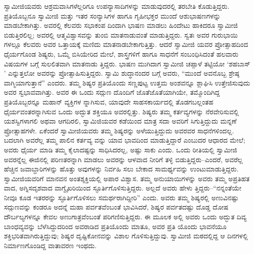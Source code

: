 ಸ್ವಾಮೀಜಿಯವರು ಆಶ್ರಮವಾಸಿಗಳೆಲ್ಲರಿಗೂ ಉಪನ್ಯಾಸಾದಿಗಳನ್ನು ಮಾಡುವುದರಲ್ಲಿ ತರಬೇತಿ ಕೊಡುತ್ತಿದ್ದರು. ಪ್ರತಿಯೊಬ್ಬನೂ ಸ್ವಾಮೀಜಿ ಮತ್ತು ಇತರ ಸಂನ್ಯಾಸಿಗಳ ಹಾಗೂ ಗೃಹೀಭಕ್ತರ ಮುಂದೆ ಆಶುಭಾಷಣಗಳನ್ನು ಮಾಡಬೇಕಾಗಿತ್ತು. ಅವರಲ್ಲಿ ಕೆಲವರು ಸಭಾಕಂಪ ದಿಂದಾಗಿ ಭಾಷಣ ಮಾಡಲು ಹಿಂದೇಟು ಹಾಕಿದರೂ ಸ್ವಾಮೀಜಿ ಬಿಡುತ್ತಿರಲಿಲ್ಲ; ಅವರಲ್ಲಿ ಆತ್ಮವಿಶ್ವಾಸವನ್ನು ತುಂಬಿ ಮಾತನಾಡುವಂತೆ ಮಾಡುತ್ತಿದ್ದರು. ಸ್ವತಃ ಅವರ ಗುರುಭಾಯಿ ಗಳಲ್ಲೂ ಕೆಲವರು ಅವರ ಒತ್ತಾಯಕ್ಕೆ ಮಣಿದು ಮಾತನಾಡಬೇಕಾಗುತ್ತಿತ್ತು. ಆದರೆ ಸ್ವಾಮೀಜಿ ಯವರ ಪ್ರೋತ್ಸಾಹದಿಂದ ಧೈರ್ಯಗೊಂಡ ಶಿಷ್ಯರು, ಒಮ್ಮೆ ಬಿಸಿಯೇರಿದ ಮೇಲೆ, ಶಾಸ್ತ್ರಗಳಿಗೆ ಹಾಗೂ ಸಾಧನೆಗೆ ಸಂಬಂಧಿಸಿದಂತೆ ಹಲವಾರು ವಿಷಯಗಳ ಬಗ್ಗೆ ಸುಲಲಿತವಾಗಿ ಮಾತನಾಡು ತ್ತಿದ್ದರು. ಭಾಷಣ ಮುಗಿದಾಗ ಸ್ವಾಮೀಜಿ ಚಪ್ಪಾಳೆ ತಟ್ಟಿಯೋ ‘ಶಹಬಾಸ್​’ ಎನ್ನುತ್ತಲೋ ಅವರನ್ನು ಪ್ರೋತ್ಸಾಹಿಸುತ್ತಿದ್ದರು. ಸ್ವಾಮಿ ಶುದ್ಧಾನಂದರ ಬಗ್ಗೆ ಅವರು, “ಮುಂದೆ ಅವನೊಬ್ಬ ಶ್ರೇಷ್ಠ ವಾಗ್ಮಿಯಾಗುತ್ತಾನೆ” ಎಂದರು. ತಮ್ಮ ಶಿಷ್ಯರ ಪ್ರತಿಯೊಂದು ಸಣ್ಣಪುಟ್ಟ ಉತ್ತಮ ಅಂಶವನ್ನೂ ಶ್ಲಾಘಿಸಿ ಉತ್ತೇಜಿಸುವುದು ಅವರ ಸ್ವಭಾವವಾಗಿತ್ತು. ಅವರ ಈ ಒಂದು ಸದ್ಗುಣ ದೊಂದಿಗೆ ಜೊತೆಜೊತೆಯಾಗಿಯೇ, ತಮ್ಮೊಂದಿಗಿದ್ದ ಪ್ರತಿಯೊಬ್ಬರನ್ನೂ ಮಹಾನ್ ವ್ಯಕ್ತಿಗಳ ನ್ನಾಗಿಸುವ, ಯಾವುದೇ ಸಾಹಸಕಾರ್ಯದಲ್ಲಿ ತೊಡಗಬಲ್ಲಂತಹ ಧೈರ್ಯವಂತರನ್ನಾಗಿಸುವ ಒಂದು ಅದ್ಭುತ ಶಕ್ತಿಯೂ ಅವರಲ್ಲಿತ್ತು. ಶಿಷ್ಯರು ತಮ್ಮ ಕರ್ತವ್ಯಗಳನ್ನು ನೆರವೇರಿಸುವಲ್ಲಿ ಯಶಸ್ವಿಗಳಾಗಲಿ ಅಥವಾ ಆಗದಿರಲಿ, ಸ್ವಾಮಿಜಿಯವರ ಕಡೆಯಿಂದ ಮಾತ್ರ ಸದಾ ಅವರಿಗೆ ಸಿಗುತ್ತಿದ್ದುದು ಮನ್ನಣೆ ಪ್ರೋತ್ಸಾಹಗಳೇ. ಏಕೆಂದರೆ ಸ್ವಾಮೀಜಿಯವರು ತಮ್ಮ ಶಿಷ್ಯರನ್ನು ಅಳೆಯುತ್ತಿದ್ದುದು ಅವರವರ ಸಾಧನೆಗಳಿಂದಲ್ಲ. ಬದಲಾಗಿ ಅವರೆಲ್ಲ ತಮ್ಮ ಪಾಲಿನ ಕರ್ತವ್ಯ ವನ್ನು ಯಾವ ಭಾವದಿಂದ ಮಾಡುತ್ತಿದ್ದಾರೆ ಎಂಬುದರ ಆಧಾರದ ಮೇಲೆ; ಅವರು ಧೈರ್ಯ ಮಾಡಿ ತಮ್ಮ ಕೈಲಾದಷ್ಟನ್ನು ಸಾಧಿಸಿದರಲ್ಲ, ಅಷ್ಟು ಸಾಕು ಎಂದು. ಒಂದು ರೀತಿಯಲ್ಲಿ ಸ್ವಾಮೀಜಿ ಅವರನ್ನೆಲ್ಲ ಈಜಿನಲ್ಲಿ ಪರಿಣತರನ್ನಾಗಿ ಮಾಡಲು ಅವರನ್ನು ಆಳವಾದ ನೀರಿಗೆ ತಳ್ಳಿ ಬಿಡುತ್ತಿದ್ದರು–ಎಂದರೆ, ಅವರೆಲ್ಲ ಹೆಚ್ಚಿನ ಜವಾಬ್ದಾರಿಗಳನ್ನು ಹೊತ್ತು ಅವುಗಳನ್ನು ನಿರ್ವಹಿ ಸಲು ಬೇಕಾದ ಸಾಮರ್ಥ್ಯವನ್ನು ಉಂಟುಮಾಡುತ್ತಿದ್ದರು. ಸ್ವಾಮೀಜಿಯವರಿಗೆ ಮಾನವನ ಅಂತಶ್ಶಕ್ತಿಯಲ್ಲಿ ಅಪಾರ ವಿಶ್ವಾಸ. ತಮ್ಮ ಅನುಯಾಯಿಗಳನ್ನು ಅವರು ತಮ್ಮ ಅಪ್ರತಿಹತ ವಾದ, ಅಗ್ನಿಸದೃಶವಾದ ವಾಗ್ವೈಖರಿಯಿಂದ ಸ್ಫೂರ್ತಿಗೊಳಿಸುತ್ತಿದ್ದರು. ಅಲ್ಲದೆ ಅವರು ಹೇಳು ತ್ತಿದ್ದರು–“ನನ್ನಂತೆಯೇ ನೀವೂ ಕೂಡ ಇತರರನ್ನು ಸ್ಫೂರ್ತಿಗೊಳಿಸಲು ಸಮರ್ಥರಾಗಿದ್ದೀರಿ” ಎಂದು. ಅವರು ತಮ್ಮ ಶಿಷ್ಯರಲ್ಲಿ ಅಣುವಿನಷ್ಟು ಸದ್ಗುಣವನ್ನು ಕಂಡರೂ ಅದನ್ನೆ ಮಹಾ ಪರ್ವತವೆಂಬಂತೆ ಭಾವಿಸಿದರೆ, ಶಿಷ್ಯರ ಪರ್ವತದಷ್ಟು ದೊಡ್ಡ ದೋಷ ದೌರ್ಬಲ್ಯಗಳನ್ನೂ ಕೇವಲ ಅಣುಗಾತ್ರವೆಂಬಂತೆ ಪರಿಗಣಿಸುತ್ತಿದ್ದರು. ಈ ಮೂಲಕ ಅಲ್ಲಿ ಅವರು ಒಂದು ಅದ್ಭುತ ದಿವ್ಯ ಬಾಂಧವ್ಯವನ್ನು ಬೆಳೆಸಿದ್ದುದರಿಂದ ಅವರಾಡಿದ ಪ್ರತಿಯೊಂದು ಮಾತೂ, ಅವರ ಪ್ರತಿ ಯೊಂದು ಭಾವನೆಯೂ ಶಕ್ತಿಭರಿತವಾಗಿರುತ್ತಿದ್ದುವು; ಶಿಷ್ಯರ ದೃಷ್ಟಿಕೋನವನ್ನು ವಿಶಾಲ ಗೊಳಿಸುತ್ತಿದ್ದುವು. ಸ್ವಾಮೀಜಿ ಮಠದಲ್ಲಿದ್ದ ಆ ದಿನಗಳಲ್ಲಿ ನಿರ್ಮಾಣಗೊಂಡಿದ್ದ ವಾತಾವರಣ ಇಂಥದು.

